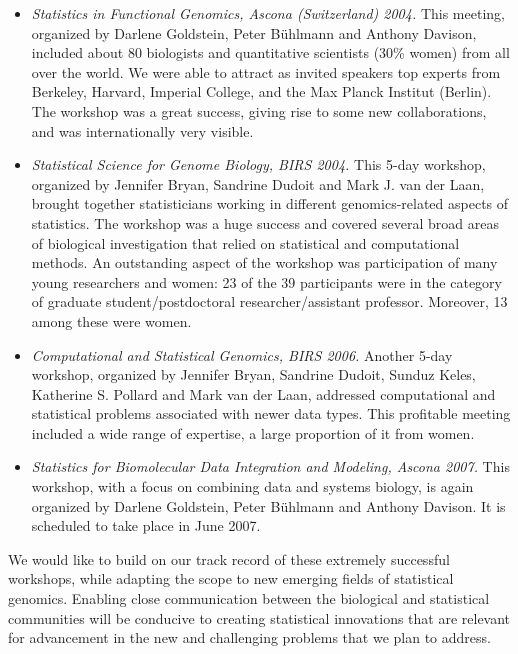 \documentclass[12pt]{amsart}
\begin{document}
\begin{itemize}
\item \textit{Statistics in Functional Genomics, Ascona (Switzerland) 2004.}
This meeting, organized by Darlene Goldstein, Peter B\"uhlmann and Anthony Davison,
included about 80 biologists and quantitative scientists (30\% women) from all
over the world.
We were able to attract as invited speakers top experts from 
Berkeley, Harvard, Imperial College, and the Max Planck Institut (Berlin).
The workshop was a great success, giving rise to some
new collaborations, and was internationally very visible.

\item \textit{Statistical Science for Genome Biology, BIRS 2004.}
This 5-day workshop, organized by Jennifer Bryan, Sandrine Dudoit and
Mark J. van der Laan, brought together
statisticians working in different genomics-related aspects of statistics. 
The workshop was a huge success and covered several
broad areas of biological investigation that relied on statistical
and computational methods. 
An outstanding aspect of the workshop
was participation of many young researchers and women:  23 of the
39 participants were in the category of graduate
student/postdoctoral researcher/assistant professor. 
Moreover, 13 among these were women. 

\item \textit{Computational and Statistical Genomics, BIRS 2006.}
Another 5-day workshop, organized by Jennifer Bryan, Sandrine Dudoit, 
Sunduz Keles, Katherine S. Pollard and Mark van der Laan, 
addressed computational and statistical problems
associated with newer data types.
This profitable meeting included a wide range of expertise,
a large proportion of it from women.

\item \textit{Statistics for Biomolecular Data Integration and Modeling, Ascona 2007.}
This workshop, with a focus on combining data and systems biology, is again organized by Darlene Goldstein, Peter B\"uhlmann and Anthony Davison.
It is scheduled to take place in June 2007.
\end{itemize}

We would like to build on our track record of these extremely
successful workshops, while adapting the scope to new emerging fields of
statistical genomics. 
Enabling close communication between the
biological and statistical communities
will be conducive to creating statistical innovations that are
relevant for advancement in the new and challenging
problems that we plan to address.
\end{document}
